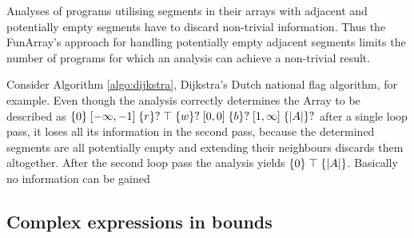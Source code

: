  Analyses of programs utilising segments in their arrays with adjacent and potentially empty segments have to discard non-trivial information. Thus the FunArray's approach for handling potentially empty adjacent segments limits the number of programs for which an analysis can achieve a non-trivial result.
 
 Consider Algorithm \ref{algo:dijkstra}, Dijkstra's Dutch national flag algorithm, for example. Even though the analysis correctly determines the Array to be described as $\{0\} \;[-\infty, -1]\; \{r\}? \;\top\; \{w\}? \;[0, 0]\; \{b\}? \;[1, \infty]\;  \{|A|\}?$ after a single loop pass, it loses all its information in the second pass, because the determined segments are all potentially empty and extending their neighbours discards them altogether. After the second loop pass the analysis yields $\{0\} \;\top\; \{|A|\}$. Basically no information can be gained   
 
 \subsection{Complex expressions in bounds}
 


